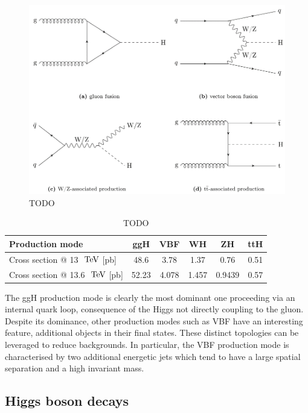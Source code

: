 \begin{figure}[h]
\centering
\includegraphics[width= .9\textwidth]{Figures/Introduction/Higgs_ProductionModes.png}
\caption{TODO}\label{Figure:Introduction_HiggsProductionModes}
\end{figure}

\begin{table}[h]
\centering
\begin{tabular}{l|c|c|c|c|c}
\hline
Production mode                   & ggH   & VBF   & WH    & ZH     & ttH  \\ \hline
Cross section @ 13~$\,\text{Te\hspace{-.08em}V}$ {[}pb{]}   & 48.6  & 3.78  & 1.37  & 0.76   & 0.51 \\
\hline
Cross section @ 13.6~$\,\text{Te\hspace{-.08em}V}$ {[}pb{]} & 52.23 & 4.078 & 1.457 & 0.9439 & 0.57
\end{tabular}
\caption{TODO}
\label{Table:Introduction_HiggsProduction_XS}
\end{table}

The ggH production mode is clearly the most dominant one proceeding via an internal quark loop, consequence of the Higgs not directly coupling to the gluon. Despite its dominance, other production modes such as VBF have an interesting feature, additional objects in their final states. These distinct topologies can be leveraged to reduce backgrounds. In particular, the VBF production mode is characterised by two additional energetic jets which tend to have a large spatial separation and a high invariant mass.

\subsection{Higgs boson decays}


